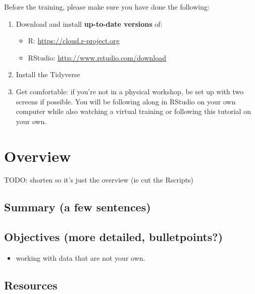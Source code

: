 \documentclass[]{book}
\providecommand{\tightlist}{%
  \setlength{\itemsep}{0pt}\setlength{\parskip}{0pt}}
\begin{document}
Before the training, please make sure you have done the following:

\begin{enumerate}
\def\labelenumi{\arabic{enumi}.}
\tightlist
\item
  Download and install \textbf{up-to-date versions} of:

  \begin{itemize}
  \tightlist
  \item
    R: \url{https://cloud.r-project.org}
  \item
    RStudio: \url{http://www.rstudio.com/download}
  \end{itemize}
\item
  Install the Tidyverse
  \\
\item
  Get comfortable: if you're not in a physical workshop, be set up with two screens if possible. You will be following along in RStudio on your own computer while also watching a virtual training or following this tutorial on your own.
\end{enumerate}

\hypertarget{overview}{%
\chapter{Overview}\label{overview}}

TODO: shorten so it's just the overview (ie cut the Rscripts)

\hypertarget{summary-a-few-sentences}{%
\section{Summary (a few sentences)}\label{summary-a-few-sentences}}

\hypertarget{objectives-more-detailed-bulletpoints}{%
\section{Objectives (more detailed, bulletpoints?)}\label{objectives-more-detailed-bulletpoints}}

\begin{itemize}
\tightlist
\item
  working with data that are not your own.
\end{itemize}

\hypertarget{resources}{%
\section{Resources}\label{resources}}
\end{document}

